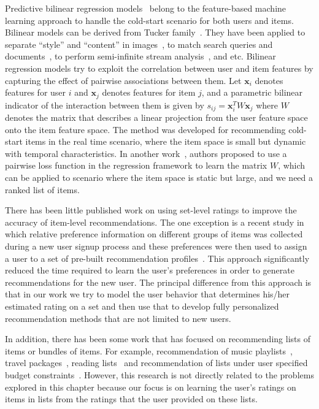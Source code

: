 Predictive bilinear regression models~\cite{chu09www} belong to the feature-based
machine learning approach to handle the cold-start scenario for both users and
items. Bilinear models can be derived from Tucker family~\cite{tucker66}. They have
been applied to separate ``style'' and ``content'' in images~\cite{tenenbaum00}, to
match search queries and documents~\cite{wu13jmlr}, to perform semi-infinite stream
analysis~\cite{sun06kdd}, and etc. Bilinear regression models try to exploit the
correlation between user and item features by capturing the effect of pairwise
associations between them. Let $\bm{x}_i$ denotes features for user $i$ and $\bm{x}_j$
denotes features for item $j$, and a parametric bilinear indicator of the
interaction between them is given by $s_{ij} = \bm{x}_i^TW\bm{x}_j$ where $W$ denotes
the matrix that describes a linear projection from the user feature space onto
the item feature space. The method was developed for recommending cold-start
items in the real time scenario, where the item space is small but dynamic
with temporal characteristics. In another work~\cite{park09recsys}, authors proposed to
use a pairwise loss function in the regression framework to learn the matrix
$W$, which can be applied to scenario where the item space is static but
large, and we need a ranked list of items.








There has been little published work on using set-level ratings to improve the
accuracy of item-level recommendations. The one exception is a recent study in which relative
preference information on different groups of items was collected during a new user
signup process and these preferences were then used to assign a user to a set of
pre-built recommendation profiles~\cite{r53}. 
This approach significantly reduced the time required to learn the user's
preferences in order to generate recommendations for the new user.
The principal difference from this 
approach is that in our work we try to model the user behavior that determines
his/her estimated rating on a set and then use that to develop fully
personalized recommendation methods that are not limited to new users.

In addition, there has been some work that  has focused on recommending
lists of items or bundles of items. For example, recommendation of music
playlists~\cite{r55,moore2012learning,aizenberg2012build}, travel
packages~\cite{interdonato2013versatile,r54,liu2011personalized,xie2011comprec}, reading
lists~\cite{r56} and recommendation of lists under user specified budget
constraints~\cite{xie2010breaking,BenouaretRecsys16}.
However, this research is not directly related to the problems explored in this
chapter because our focus is on learning the user's ratings on items in lists from
the ratings that the user provided on these lists.

